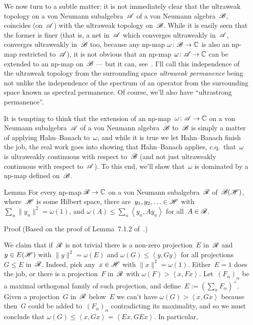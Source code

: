 \documentclass[a]{subfiles}
\begin{document}
\begin{parsec}%
\begin{point}%
We now turn to a subtle matter:
it is not immediately clear
that the ultraweak topology on a von Neumann
subalgebra~$\mathscr{A}$ of a von Neumann algebra~$\mathscr{B}$,
coincides (on~$\mathscr{A}$) with the ultraweak topology on~$\mathscr{B}$.
While it is easily seen that the former is finer
(that is, a net in~$\mathscr{A}$ which converges ultraweakly in~$\mathscr{A}$,
converges ultraweakly in~$\mathscr{B}$ too, because any np-map 
$\omega\colon \mathscr{B}\to\mathbb{C}$ is also an np-map restricted to~$\mathscr{A}$),
it is not obvious that an np-map $\omega\colon \mathscr{A}\to\mathbb{C}$
can be extended to an np-map on~$\mathscr{B}$
--- but it can, see~.
I'll call this independence of the ultraweak topology
from the surrounding space
\emph{ultraweak permanence}
being not unlike the independence
of the spectrum of an operator from the surrounding space
known as spectral permanence. 
Of course,
we'll also have ``ultrastrong permanence''.

It is tempting to think that the extension of an np-map~$\omega\colon \mathscr{A}
\to\mathbb{C}$
on a von Neumann
subalgebra~$\mathscr{A}$ of a von Neumann algebra~$\mathscr{B}$
to~$\mathscr{B}$ is simply a matter of applying Hahn--Banach to~$\omega$,
and while it is true we let Hahn--Banach finish the job,
the real work goes into showing that Hahn--Banach applies,
c.q.~that~$\omega$ is ultraweakly continuous with respect to~$\mathscr{B}$
(and not just ultraweakly continuous with respect to~$\mathscr{A}$).
To this end, we'll show that~$\omega$
is dominated by a np-map defined on~$\mathscr{B}$.
\end{point}
\begin{point}{Lemma}%
For every np-map $\mathscr{R}\to\mathbb{C}$
on a von Neumann subalgebra~$\mathscr{R}$
of~$\mathscr{B}(\mathscr{H})$,
where~$\mathscr{H}$ is some Hilbert space,
there are~$y_1,y_2,\dotsc\in \mathscr{H}$
with $\sum_n \|y_n\|^2 =\omega(1)$,
and $\omega(A)\leq \sum_n \left<y_n,Ay_n\right>$
for all~$A\in\mathscr{R}$.
\begin{point}{Proof}%
(Based on the proof of Lemma~7.1.2 of~\cite{kr}.)

We claim that if~$\mathscr{R}$ is not trivial
there is a non-zero projection~$E$ in~$\mathscr{R}$
and~$y\in E(\mathscr{H})$ with $\|y\|^2 = \omega(E)$
and $\omega(G)\leq \left<y,Gy\right>$
for all projections~$G\leq E$ in~$\mathscr{R}$.
Indeed,
pick any~$x\in\mathscr{H}$ with $\|x\|^2=\omega(1)$.
Either~$E=1$ does the job,
or there is a projection~$F$ in~$\mathscr{R}$ with
$\omega(F) > \left<x,Fx\right>$.
Let~$(F_\alpha)_\alpha$
be a maximal orthogonal family of such projection,
and define~$E:=(\sum_\alpha F_\alpha)^\perp$.
Given a projection~$G$ in~$\mathscr{R}$ below~$E$
we can't have $\omega(G) > \left<x,G x\right>$
because then~$G$ could be added to~$(F_\alpha)_\alpha$
contradicting its maximality,
and so we must conclude that $\omega(G)\leq \left<x,G x\right>
=\left<Ex,GEx\right>$.
In particular, 
\TODO{}
\end{point}
\end{point}

\end{parsec}
\end{document}
